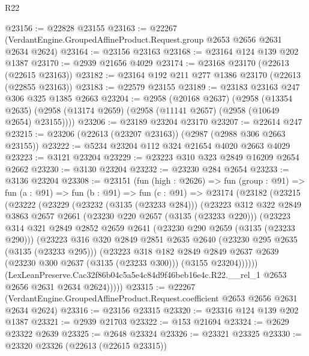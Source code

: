\begin{lexlean}{R22}
\begin{coremodule}
@23156 := @22828 @23155
@23163 := @22267 (VerdantEngine.GroupedAffineProduct.Request.group @2653 @2656 @2631 @2634 @2624)
@23164 := @23156 @23163
@23168 := @23164 @124 @139 @202 @1387
@23170 := @2939 @21656 @4029
@23174 := @23168 @23170 (@22613 (@22615 @23163))
@23182 := @23164 @192 @211 @277 @1386 @23170 (@22613 (@22855 @23163))
@23183 := @22579 @23155
@23189 := @23183 @23163 @247 @306 @325 @1385 @2663
@23204 := @2958
    (@20168 @2637)
    (@2958
      (@13354 @2635)
      (@2958 (@13174 @2659) (@2958 (@11141 @2657) (@2958 (@10649 @2654) @23155))))
@23206 := @23189 @23204 @23170
@23207 := @22614 @247
@23215 := @23206 (@22613 (@23207 @23163)) (@2987 (@2988 @306 @2663 @23155))
@23222 := @5234 @23204 @112 @324 @21654 @4020 @2663 @4029
@23223 := @3121 @23204
@23229 := @23223 @310 @323 @2849 @16209 @2654 @2662
@23230 := @3130 @23204
@23232 := @23230 @284 @2654
@23233 := @3136 @23204
@23308 := @23151
    (fun (high : @2626) =>
    fun (group : @91) =>
    fun (a : @91) =>
    fun (b : @91) =>
    fun (c : @91) =>
    @23174
      (@23182
        (@23215
          (@23222
            (@23229
              (@23232 (@3135 (@23233 @284)))
              (@23223
                @312
                @322
                @2849
                @3863
                @2657
                @2661
                (@23230 @220 @2657 (@3135 (@23233 @220)))
                (@23223
                  @314
                  @321
                  @2849
                  @2852
                  @2659
                  @2641
                  (@23230 @290 @2659 (@3135 (@23233 @290)))
                  (@23223
                    @316
                    @320
                    @2849
                    @2851
                    @2635
                    @2640
                    (@23230 @295 @2635 (@3135 (@23233 @295)))
                    (@23223
                      @318
                      @182
                      @2849
                      @2849
                      @2637
                      @2639
                      (@23230 @300 @2637 (@3135 (@23233 @300)))
                      (@3155 @23204))))))
            (LexLeanPreserve.Cac32f86b04c5a5e4c84d9f46beb16e4c.R22.__rel_1
              @2653
              @2656
              @2631
              @2634
              @2624)))))
@23315 := @22267
    (VerdantEngine.GroupedAffineProduct.Request.coefficient @2653 @2656 @2631 @2634 @2624)
@23316 := @23156 @23315
@23320 := @23316 @124 @139 @202 @1387
@23321 := @2939 @21703
@23322 := @153 @21694
@23324 := @2629 @23322 @2639
@23325 := @2648 @23324
@23326 := @23321 @23325
@23330 := @23320 @23326 (@22613 (@22615 @23315))

\end{coremodule}
\end{lexlean}
